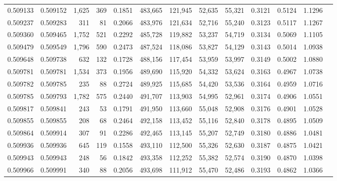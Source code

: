 \begin{tabular}{rrrrrrrrrrrrr}
0.509133 & 0.509152 & 1,625 &   369 &                                     0.1851 & 483,665 & 121,945 &  52,635 &  55,321 & 0.3121 & 0.5124 & 1.1296 \\
0.509237 & 0.509283 &   311 &    81 &                                     0.2066 & 483,976 & 121,634 &  52,716 &  55,240 & 0.3123 & 0.5117 & 1.1267 \\
0.509360 & 0.509465 & 1,752 &   521 &                                     0.2292 & 485,728 & 119,882 &  53,237 &  54,719 & 0.3134 & 0.5069 & 1.1105 \\
0.509479 & 0.509549 & 1,796 &   590 &                                     0.2473 & 487,524 & 118,086 &  53,827 &  54,129 & 0.3143 & 0.5014 & 1.0938 \\
0.509648 & 0.509738 &   632 &   132 &                                     0.1728 & 488,156 & 117,454 &  53,959 &  53,997 & 0.3149 & 0.5002 & 1.0880 \\
0.509781 & 0.509781 & 1,534 &   373 &                                     0.1956 & 489,690 & 115,920 &  54,332 &  53,624 & 0.3163 & 0.4967 & 1.0738 \\
0.509782 & 0.509785 &   235 &    88 &                                     0.2724 & 489,925 & 115,685 &  54,420 &  53,536 & 0.3164 & 0.4959 & 1.0716 \\
0.509785 & 0.509793 & 1,782 &   575 &                                     0.2440 & 491,707 & 113,903 &  54,995 &  52,961 & 0.3174 & 0.4906 & 1.0551 \\
0.509817 & 0.509841 &   243 &    53 &                                     0.1791 & 491,950 & 113,660 &  55,048 &  52,908 & 0.3176 & 0.4901 & 1.0528 \\
0.509855 & 0.509855 &   208 &    68 &                                     0.2464 & 492,158 & 113,452 &  55,116 &  52,840 & 0.3178 & 0.4895 & 1.0509 \\
0.509864 & 0.509914 &   307 &    91 &                                     0.2286 & 492,465 & 113,145 &  55,207 &  52,749 & 0.3180 & 0.4886 & 1.0481 \\
0.509936 & 0.509936 &   645 &   119 &                                     0.1558 & 493,110 & 112,500 &  55,326 &  52,630 & 0.3187 & 0.4875 & 1.0421 \\
0.509943 & 0.509943 &   248 &    56 &                                     0.1842 & 493,358 & 112,252 &  55,382 &  52,574 & 0.3190 & 0.4870 & 1.0398 \\
0.509966 & 0.509991 &   340 &    88 &                                     0.2056 & 493,698 & 111,912 &  55,470 &  52,486 & 0.3193 & 0.4862 & 1.0366 \\

\end{tabular}
